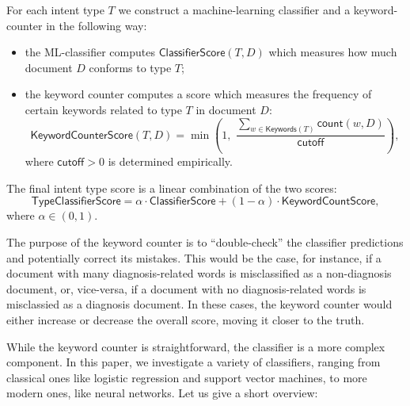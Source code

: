 For each intent type $T$ we construct a machine-learning classifier and a keyword-counter in the following way:
\begin{itemize}
 \item the ML-classifier computes $\textsf{ClassifierScore}(T,D)$ which measures how much document $D$ conforms to type $T$;
 \item the keyword counter computes a score which measures the frequency of certain keywords related to type $T$ in document $D$:
 \begin{equation}\label{basic-formula}
  \textsf{KeywordCounterScore}(T,D) = \min\left(1,\,\, \displaystyle\frac{\displaystyle\sum_{w\in \textsf{Keywords}(T)} \textsf{count}(w,D)}{\textsf{cutoff}}\right),
 \end{equation}
  where $\textsf{cutoff} > 0$ is determined empirically.
\end{itemize}

The final intent type score is a linear combination of the two scores:
\begin{equation}\label{clf-combine-formula}
 \textsf{TypeClassifierScore} = \alpha\cdot\textsf{ClassifierScore} + (1-\alpha)\cdot\textsf{KeywordCountScore},
\end{equation}
where $\alpha\in (0,1)$.

The purpose of the keyword counter is to ``double-check'' the classifier predictions and potentially correct its mistakes.
This would be the case, for instance,
if a document with many diagnosis-related words is misclassified as a non-diagnosis document,
or, vice-versa, if a document with no diagnosis-related words is misclassied as a diagnosis document.
In these cases, the keyword counter would either increase or decrease the overall score, moving it closer to the truth.


While the keyword counter is straightforward, the classifier is a more complex component. In this paper, we investigate 
a variety of classifiers, ranging from classical ones like logistic regression and support vector machines, to more modern
ones, like neural networks. Let us give a short overview:

